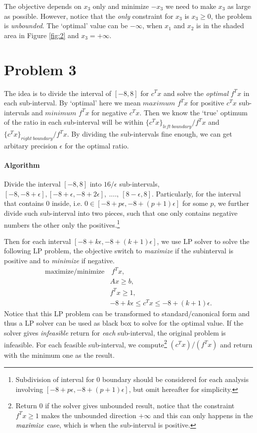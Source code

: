 \documentclass[12pt]{article}
\begin{document}
The objective depends on $x_3$ only and minimize $-x_3$ we need to make $x_3$ as large as possible. However, notice that the \emph{only} constraint for $x_3$ is $x_3 \geq 0$, the problem is \emph{unbounded}. The `optimal' value can be $-\infty$, when $x_1$ and $x_2$ is in the shaded area in Figure \ref{fig:2} and $x_3=+\infty$. 

\newpage

\section*{Problem 3}
The idea is to divide the interval of $[-8, 8]$ for $c^Tx$ and solve the \emph{optimal} $f^Tx$ in each sub-interval. By `optimal' here we mean $maximum$ $f^Tx$ for positive $c^Tx$ sub-intervals and $minimum$ $f^Tx$ for negative $c^Tx$. Then we know the `true' optimum of the ratio in each sub-interval will be within $\{c^Tx\}_{left\:boundary} / f^T x$ and $\{c^Tx\}_{right\:boundary} / f^T x$. By dividing the sub-intervals fine enough, we can get arbitary precision $\epsilon$ for the optimal ratio. 
\paragraph{Algorithm} Divide the interval $[-8, 8]$ into $16/\epsilon$ sub-intervals, $[-8, -8 + \epsilon], [-8 + \epsilon, -8 + 2\epsilon], ~...., ~[8 - \epsilon, 8]$. Particularly, for the interval that contains $0$ inside, i.e. $0 \in [-8 + p\epsilon, -8 + (p+1)\epsilon]$ for some $p$, we further divide such sub-interval into two pieces, such that one only contains negative numbers the other only the positives.\footnote{Subdivision of interval for $0$ boundary should be considered for each analysis involving $[-8 + p\epsilon, -8 + (p+1)\epsilon]$, but omit hereafter for simplicity.} 

Then for each interval $[-8 + k\epsilon, -8 + (k+1)\epsilon]$, we use LP solver to solve the following LP problem, the objective switch to \emph{maximize} if the subinterval is positive and to \emph{minimize} if negative.
\begin{align*}
\text{maximize/minimize} &~f^Tx, \\
& Ax \geq b,\\
& f^Tx \geq 1,\\
& -8 + k\epsilon \leq c^Tx \leq -8 + (k+1)\epsilon.
\end{align*}
Notice that this LP problem can be transformed to standard/canonical form and thus a LP solver can be used as black box to solve for the optimal value. If the solver gives \emph{infeasible} return for \emph{each} sub-interval, the original problem is infeasible. For each feasible sub-interval, we compute\footnote{Return $0$ if the solver gives unbounded result, notice that the constraint $f^Tx \geq 1$ makes the unbounded direction $+\infty$ and this can only happens in the $\emph{maximize}$ case, which is when the sub-interval is positive.} $(c^Tx)/(f^Tx)$ and return with the minimum one as the result. 
\end{document}
